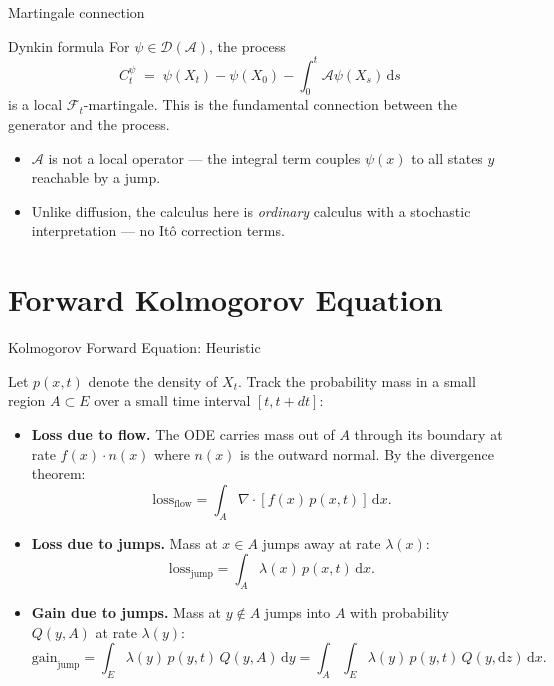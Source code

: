 \documentclass[aspectratio=169]{beamer}
\begin{document}
\begin{frame}{Martingale connection}

    \begin{block}{Dynkin formula}
    For $\psi \in \mathcal{D}(\mathcal{A})$, the process
    \[
      C_t^\psi \;=\; \psi(X_t) - \psi(X_0) - \int_0^t \mathcal{A}\psi(X_s)\,\mathrm{d}s
    \]
    is a local $\mathcal{F}_t$-martingale. This is the fundamental connection
    between the generator and the process.
  \end{block}

  \bigskip
  \begin{itemize}
    \item $\mathcal{A}$ is \alert{not a local operator} --- the integral term
          couples $\psi(x)$ to all states $y$ reachable by a jump.
    \item Unlike diffusion, the calculus here is \emph{ordinary} calculus
          with a stochastic interpretation --- no It\^o correction terms.
  \end{itemize}

\end{frame}

\section{Forward Kolmogorov Equation}

\begin{frame}{Kolmogorov Forward Equation: Heuristic}

  Let $p(x,t)$ denote the density of $X_t$. Track the probability mass
  in a small region $A \subset E$ over a small time interval $[t, t+dt]$:

  \bigskip
  \begin{itemize}
    \setlength\itemsep{8pt}

    \item \textbf{Loss due to flow.} The ODE carries mass out of $A$
          through its boundary at rate $f(x)\cdot n(x)$ where $n(x)$ is
          the outward normal. By the divergence theorem:
          \[
            \text{loss}_{\text{flow}} = \int_A \nabla\cdot[f(x)\,p(x,t)]\,\mathrm{d}x.
          \]

    \item \textbf{Loss due to jumps.} Mass at $x \in A$ jumps away at
          rate $\lambda(x)$:
          \[
            \text{loss}_{\text{jump}} = \int_A \lambda(x)\,p(x,t)\,\mathrm{d}x.
          \]

    \item \textbf{Gain due to jumps.} Mass at $y \notin A$ jumps into
          $A$ with probability $Q(y, A)$ at rate $\lambda(y)$:
          \[
            \text{gain}_{\text{jump}} = \int_E \lambda(y)\,p(y,t)\,Q(y,A)\,\mathrm{d}y
            = \int_A \int_E \lambda(y)\,p(y,t)\,Q(y,\mathrm{d}z)\,\mathrm{d}x.
          \]
  \end{itemize}
\end{frame}
\end{document}
